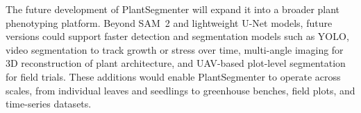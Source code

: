 \documentclass[12pt, a4paper]{article}
\begin{document}
The future development of PlantSegmenter will expand it into a broader plant phenotyping platform. Beyond SAM~2 and lightweight U-Net models, future versions could support faster detection and segmentation models such as YOLO, video segmentation to track growth or stress over time, multi-angle imaging for 3D reconstruction of plant architecture, and UAV-based plot-level segmentation for field trials. These additions would enable PlantSegmenter to operate across scales, from individual leaves and seedlings to greenhouse benches, field plots, and time-series datasets.  



\end{document}
